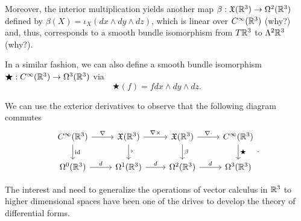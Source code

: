 \begin{example}
	Moreover, the interior multiplication yields another map $\beta: \mathfrak{X}(\mathbb{R}^3)\to\Omega^2(\mathbb{R}^3)$ defined by $\beta(X) = \iota_X (dx\wedge dy\wedge dz)$, which is linear over $C^\infty(\mathbb{R}^3)$ (why?) and, thus, corresponds to a smooth bundle isomorphism from $T\mathbb{R}^3$ to $\Lambda^2\mathbb{R}^3$ (why?).

	In a similar fashion, we can also define a smooth bundle isomorphism $\bigstar: C^\infty(\mathbb{R}^3) \to \Omega^3(\mathbb{R}^3)$ via
	\begin{equation}
		\bigstar(f) = f dx\wedge dy\wedge dz.
	\end{equation}

	We can use the exterior derivatives to observe that the following diagram commutes
	\begin{equation}\label{diag:comm:r3ops}
		\begin{tikzcd}
			C^\infty(\R^3) \arrow[d, "\id"] \arrow[r, "\nabla"] &
			\fX(\R^3) \arrow[d, "{}^\flat"] \arrow[r, "\nabla\times"] &
			\fX(\R^3) \arrow[d, "\beta"] \arrow[r, "\nabla\cdot"] &
			C^\infty(\R^3) \arrow[d, "\bigstar"] \\
			\Omega^0(\R^3) \arrow[r, "d"] &
			\Omega^1(\R^3) \arrow[r, "d"] &
			\Omega^2(\R^3) \arrow[r, "d"] &
			\Omega^3(\R^3)
		\end{tikzcd}.
	\end{equation}

	The interest and need to generalize the operations of vector calculus in $\mathbb{R}^3$ to higher dimensional spaces have been one of the drives to develop the theory of differential forms.


\end{example}
